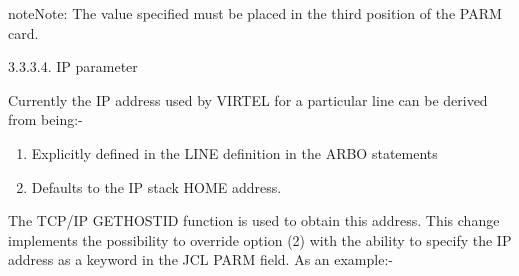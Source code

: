 \documentclass[letterpaper,10pt,english]{sphinxmanual}
\begin{document}
\begin{sphinxVerbatim}[commandchars=\\\{\}]
  
\end{sphinxVerbatim}

\begin{sphinxVerbatim}[commandchars=\\\{\}]
         
            
   
       
         
\end{sphinxVerbatim}

\begin{sphinxadmonition}{note}{Note:}
The value specified must be placed in the third position of the PARM card.
\end{sphinxadmonition}

3.3.3.4. IP parameter

Currently the IP address used by VIRTEL for a particular line can be derived from being:-
\begin{enumerate}
\item {} 
Explicitly defined in the LINE definition in the ARBO statements

\item {} 
Defaults to the IP stack HOME address.

\end{enumerate}

The TCP/IP GETHOSTID function is used to obtain this address. This change implements the possibility to override
option (2) with the ability to specify the IP address as a keyword in the JCL PARM field. As an example:-

\begin{sphinxVerbatim}[commandchars=\\\{\}]
  
\end{sphinxVerbatim}
\end{document}

